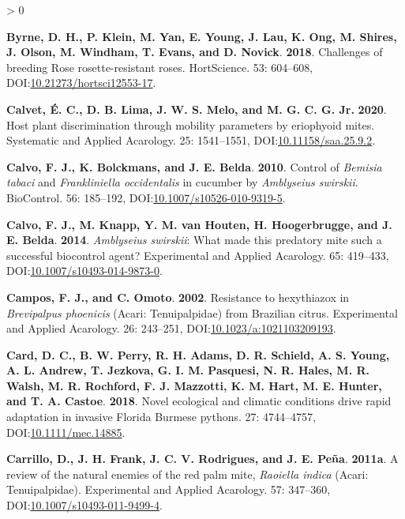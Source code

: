 \documentclass{ufdissertation}[overrideChapters] %
\newlength{\cslhangindent}
\newenvironment{CSLReferences}[2] %
 {%
  \setlength{\parindent}{0pt}
  \ifodd #1 \everypar{\setlength{\hangindent}{\cslhangindent}}\ignorespaces\fi
  \ifnum #2 > 0
  \setlength{\parskip}{#2\baselineskip}
  \fi
 }%
 {}
\begin{document}
{\begin{CSLReferences}{1}{1}
\leavevmode{}%
\textbf{Byrne, D. H., P. Klein, M. Yan, E. Young, J. Lau, K. Ong, M. Shires, J. Olson, M. Windham, T. Evans, and D. Novick}. \textbf{2018}. Challenges of breeding {Rose rosette}-resistant roses. {HortScience}. 53: 604--608, DOI:\href{https://doi.org/10.21273/hortsci12553-17}{10.21273/hortsci12553-17}.

\leavevmode{}%
\textbf{Calvet, É. C., D. B. Lima, J. W. S. Melo, and M. G. C. G. Jr.} \textbf{2020}. Host plant discrimination through mobility parameters by eriophyoid mites. Systematic and Applied Acarology. 25: 1541--1551, DOI:\href{https://doi.org/10.11158/saa.25.9.2}{10.11158/saa.25.9.2}.

\leavevmode{}%
\textbf{Calvo, F. J., K. Bolckmans, and J. E. Belda}. \textbf{2010}. Control of {\emph{Bemisia tabaci}} and {\emph{Frankliniella occidentalis}} in cucumber by {\emph{Amblyseius swirskii}}. {BioControl}. 56: 185--192, DOI:\href{https://doi.org/10.1007/s10526-010-9319-5}{10.1007/s10526-010-9319-5}.

\leavevmode{}%
\textbf{Calvo, F. J., M. Knapp, Y. M. van Houten, H. Hoogerbrugge, and J. E. Belda}. \textbf{2014}. {\emph{Amblyseius swirskii}}: What made this predatory mite such a successful biocontrol agent? Experimental and Applied Acarology. 65: 419--433, DOI:\href{https://doi.org/10.1007/s10493-014-9873-0}{10.1007/s10493-014-9873-0}.

\leavevmode{}%
\textbf{Campos, F. J., and C. Omoto}. \textbf{2002}. Resistance to hexythiazox in {\emph{Brevipalpus phoenicis}} ({Acari}: {Tenuipalpidae}) from {Brazilian} citrus. Experimental and Applied Acarology. 26: 243--251, DOI:\href{https://doi.org/10.1023/a:1021103209193}{10.1023/a:1021103209193}.

\leavevmode{}%
\textbf{Card, D. C., B. W. Perry, R. H. Adams, D. R. Schield, A. S. Young, A. L. Andrew, T. Jezkova, G. I. M. Pasquesi, N. R. Hales, M. R. Walsh, M. R. Rochford, F. J. Mazzotti, K. M. Hart, M. E. Hunter, and T. A. Castoe}. \textbf{2018}. Novel ecological and climatic conditions drive rapid adaptation in invasive {Florida} {Burmese} pythons. 27: 4744--4757, DOI:\href{https://doi.org/10.1111/mec.14885}{10.1111/mec.14885}.

\leavevmode{}%
\textbf{Carrillo, D., J. H. Frank, J. C. V. Rodrigues, and J. E. Peña}. \textbf{2011a}. A review of the natural enemies of the red palm mite, {\emph{Raoiella indica}} ({Acari}: {Tenuipalpidae}). Experimental and Applied Acarology. 57: 347--360, DOI:\href{https://doi.org/10.1007/s10493-011-9499-4}{10.1007/s10493-011-9499-4}.


\end{CSLReferences}}
\end{document}
